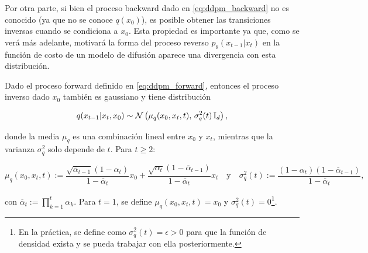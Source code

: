 Por otra parte, si bien el proceso backward dado en \eqref{eq:ddpm_backward} no es conocido (ya que no se conoce $q(x_0)$), es posible obtener las transiciones inversas cuando se condiciona a $x_0$. Esta propiedad es importante ya que, como se verá más adelante, motivará la forma del proceso reverso $p_\theta(x_{t-1}|x_t)$ en la función de costo de un modelo de difusión aparece una divergencia con esta distribución.

\begin{prop}
    \label{prop:conditional_backward}
    Dado el proceso forward definido en \eqref{eq:ddpm_forward}, entonces el proceso inverso dado $x_0$ también es gaussiano y tiene distribución

    \begin{equation}
        \label{eq:conditional_backward}
        q(x_{t-1}|x_t,x_0) \sim \mathcal{N}\left(\mu_q(x_0,x_t,t),\,\sigma_q^2(t)\operatorname{I}_{d}\right),
    \end{equation}

    donde la media $\mu_q$ es una combinación lineal entre $x_0$ y $x_t$, mientras que la varianza $\sigma_q^2$ solo depende de $t$. Para $t\geq 2$:

    \begin{equation}
        \label{eq:conditional_backward_params}
        \mu_q(x_0,x_t, t) := \frac{\sqrt{\overline{\alpha}_{t-1}}(1-\alpha_t)}{1-\overline{\alpha}_t}x_0 + \frac{\sqrt{\alpha_t}(1-\overline{\alpha}_{t-1})}{1-\overline{\alpha}_t}x_t
        \quad\text{y}\quad
        \sigma_q^2(t) := \frac{(1-\alpha_t)(1-\overline{\alpha}_{t-1})}{1-\overline{\alpha}_t},
    \end{equation}

    con $\overline{\alpha}_t := \prod\limits_{k=1}^t \alpha_k$. Para $t=1$, se define $\mu_q(x_0,x_t,t)=x_0$ y $\sigma_q^2(t)=0$\footnote{En la práctica, se define como $\sigma_q^2(t)=\epsilon>0$ para que la función de densidad exista y se pueda trabajar con ella posteriormente.}.
\end{prop}


